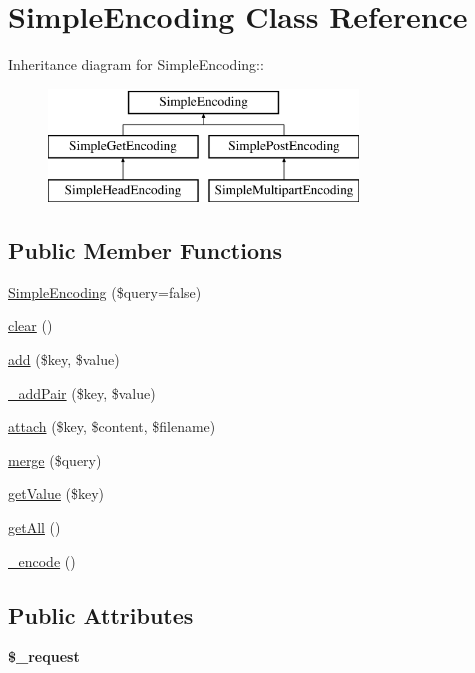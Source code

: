\hypertarget{class_simple_encoding}{
\section{SimpleEncoding Class Reference}
\label{class_simple_encoding}
}
Inheritance diagram for SimpleEncoding::\begin{figure}[H]
\begin{center}
\leavevmode
\includegraphics[height=3cm]{class_simple_encoding}
\end{center}
\end{figure}
\subsection*{Public Member Functions}
\begin{DoxyCompactItemize}
\item 
\hyperlink{class_simple_encoding_aa64e424ec343e84043886e83aacfcb91}{SimpleEncoding} (\$query=false)
\item 
\hyperlink{class_simple_encoding_a3c97df2ac54fe15a084e3742876f21fd}{clear} ()
\item 
\hyperlink{class_simple_encoding_adb82dd33e86e00ef7a8a480536747eb5}{add} (\$key, \$value)
\item 
\hyperlink{class_simple_encoding_af08f8ed896df1fb85a2a45d676e9b5f5}{\_\-addPair} (\$key, \$value)
\item 
\hyperlink{class_simple_encoding_a68a928475be4816c7f6a57cb47dc0c28}{attach} (\$key, \$content, \$filename)
\item 
\hyperlink{class_simple_encoding_a31264780522b324c1020cfe4ba3fc65c}{merge} (\$query)
\item 
\hyperlink{class_simple_encoding_ac66d3c34759e0bb892588c0cc7203b79}{getValue} (\$key)
\item 
\hyperlink{class_simple_encoding_a13d2399adeb9e4c0eb44865c1a36400b}{getAll} ()
\item 
\hyperlink{class_simple_encoding_a934397a98be4dab7d58382d83222765b}{\_\-encode} ()
\end{DoxyCompactItemize}
\subsection*{Public Attributes}
\begin{DoxyCompactItemize}
\item 
\hypertarget{class_simple_encoding_afd97fefca111e230f30466c0894c0e89}{
{\bfseries \$\_\-request}}
\label{class_simple_encoding_afd97fefca111e230f30466c0894c0e89}

\end{DoxyCompactItemize}


